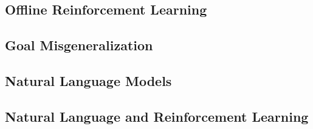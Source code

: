 \documentclass[../main.tex]{subfiles}
\begin{document}
\subsection{Offline Reinforcement Learning}
\subsection{Goal Misgeneralization}
\subsection{Natural Language Models}
\subsection{Natural Language and Reinforcement Learning}
\end{document}
